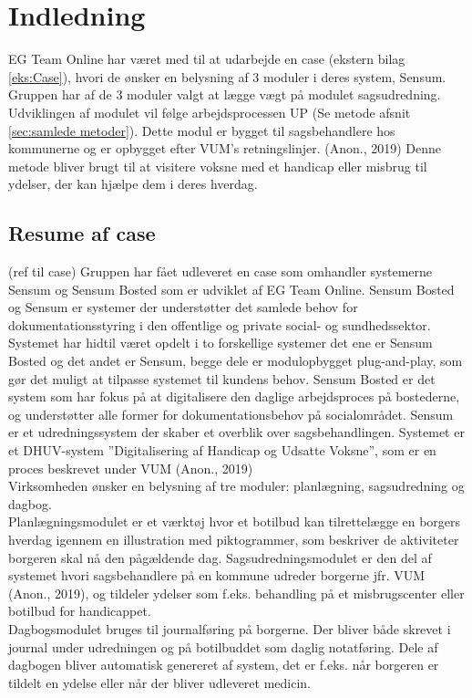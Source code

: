 \chapter{Indledning}
EG Team Online har været med til at udarbejde en case (ekstern bilag \ref{eks:Case}), hvori de ønsker en belysning af 3 moduler i deres system, Sensum. Gruppen har af de 3 moduler valgt at lægge vægt på modulet sagsudredning. Udviklingen af modulet vil følge arbejdsprocessen UP (Se metode afsnit \ref{sec:samlede metoder}). Dette modul er bygget til sagsbehandlere hos kommunerne og er opbygget efter VUM’s retningslinjer. (Anon., 2019) Denne metode bliver brugt til at visitere voksne med et handicap eller misbrug til ydelser, der kan hjælpe dem i deres hverdag.
\section{Resume af case} (ref til case)
Gruppen har fået udleveret en case som omhandler systemerne Sensum og Sensum Bosted som er udviklet af EG Team Online. Sensum Bosted og Sensum er systemer der understøtter det samlede behov for dokumentationsstyring i den offentlige og private social- og sundhedssektor.\\
Systemet har hidtil været opdelt i to forskellige systemer det ene er Sensum Bosted og det andet er Sensum, begge dele er modulopbygget plug-and-play, som gør det muligt at tilpasse systemet til kundens behov. Sensum Bosted er det system som har fokus på at digitalisere den daglige arbejdsproces på bostederne, og understøtter alle former for dokumentationsbehov på socialområdet. 
Sensum er et udredningssystem der skaber et overblik over sagsbehandlingen. 
Systemet er et DHUV-system 
”Digitalisering af Handicap og Udsatte Voksne”, som er en proces beskrevet under VUM  (Anon., 2019)
\\
Virksomheden ønsker en belysning af tre moduler: planlægning, sagsudredning og dagbog. \\
Planlægningsmodulet er et værktøj hvor et botilbud kan tilrettelægge en borgers hverdag igennem en illustration med piktogrammer, som beskriver de aktiviteter borgeren skal nå den pågældende dag.
Sagsudredningsmodulet er den del af systemet hvori sagsbehandlere på en kommune udreder borgerne jfr. VUM 
(Anon., 2019), %
og tildeler ydelser som f.eks. behandling på et misbrugscenter eller botilbud for handicappet.\\
Dagbogsmodulet bruges til journalføring på borgerne. Der bliver både skrevet i journal under udredningen og på botilbuddet som daglig notatføring. Dele af dagbogen bliver automatisk genereret af system, det er f.eks. når borgeren er tildelt en ydelse eller når der bliver udleveret medicin.
\newpage
